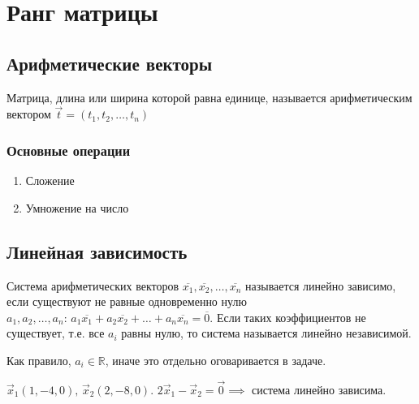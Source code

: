 \documentclass[12pt, a4paper]{article}
\begin{document}
    \section{Ранг матрицы}
    \subsection{Арифметические векторы}
    \begin{definition}
        Матрица, длина или ширина которой равна единице, называется арифметическим вектором \( \vec{t} = (t_{1}, t_{2}, \ldots , t_{n}) \)
    \end{definition}
    \subsubsection{Основные операции}
    \begin{enumerate}
        \item Сложение
        \item Умножение на число
    \end{enumerate}
    \subsection{Линейная зависимость}
    \begin{definition}
        Система арифметических векторов \( \overline{x_{1}}, \overline{x_{2}}, \ldots , \overline{x_{n}} \) называется линейно зависимо, если существуют не равные одновременно нулю \( a_{1}, a_{2}, \ldots , a_{n}: \, a_{1}\overline{x_{1}} + a_{2}\overline{x_{2}} + \ldots + a_{n}\overline{x_{n}} = \overline{0} \). Если таких коэффициентов не существует, т.е. все \( a_{i} \) равны нулю, то система называется линейно независимой.
    \end{definition}
    \begin{rem}
        Как правило, \( a_{i} \in \mathbb{R} \), иначе это отдельно оговаривается в задаче.
        
    \end{rem}
    \begin{exmp}
        \( \vec{x}_{1}(1, -4, 0), \, \vec{x}_{2}(2, -8, 0) \). \( 2\vec{x}_{1} - \vec{x}_{2} = \vec{0} \implies \) система линейно зависима.
    \end{exmp}
\end{document}
